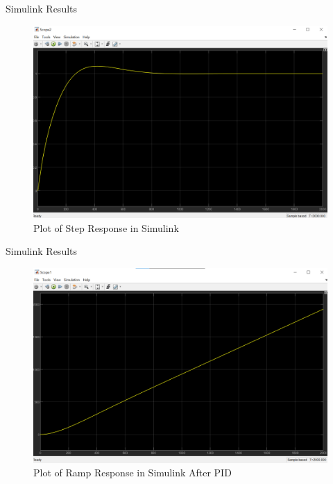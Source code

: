 \documentclass[10pt,compress,mathserif]{beamer}
\begin{document}
\begin{frame}{Simulink Results}

	\begin{figure}[h!]
		\centering
		\includegraphics[scale=0.35]{images/stepResponse_PID_Simulink.png}
		\caption{Plot of Step Response in Simulink}
	\end{figure}
\end{frame}

\begin{frame}{Simulink Results}

	\begin{figure}[h!]
		\centering
		\includegraphics[scale=0.35]{images/rampResponse_PID_Simulink.png}
		\caption{Plot of Ramp Response in Simulink After PID}
	\end{figure}
\end{frame}
\end{document}
